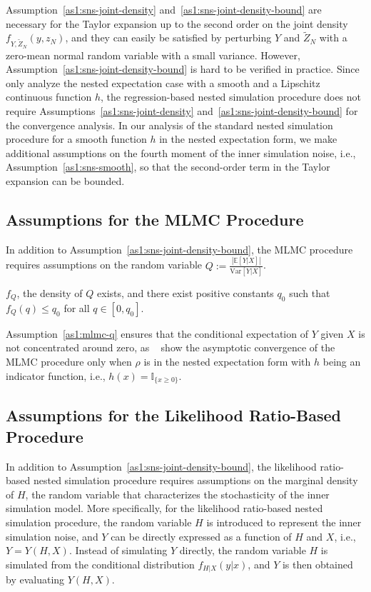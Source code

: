 Assumption~\ref{as1:sns-joint-density} and~\ref{as1:sns-joint-density-bound} are necessary for the Taylor expansion up to the second order on the joint density $f_{Y,\tilde{Z}_N}(y,z_N)$, and they can easily be satisfied by perturbing $Y$ and $\tilde{Z}_N$ with a zero-mean normal random variable with a small variance.
However, Assumption~\ref{as1:sns-joint-density-bound} is hard to be verified in practice.
Since~\cite{broadie2015risk} only analyze the nested expectation case with a smooth and a Lipschitz continuous function $h$, the regression-based nested simulation procedure does not require Assumptions~\ref{as1:sns-joint-density} and~\ref{as1:sns-joint-density-bound} for the convergence analysis.
In our analysis of the standard nested simulation procedure for a smooth function $h$ in the nested expectation form, we make additional assumptions on the fourth moment of the inner simulation noise, i.e., Assumption~\ref{as1:sns-smooth}, so that the second-order term in the Taylor expansion can be bounded. 

\subsection{Assumptions for the MLMC Procedure}
In addition to Assumption~\ref{as1:sns-joint-density-bound}, the MLMC procedure requires assumptions on the random variable $Q:= \frac{|\mathbb{E} \left[ Y | X \right]|}{\text{Var}[Y|X]}$.

\begin{assumption} \label{as1:mlmc-q}
    $f_Q$, the density of $Q$ exists, and there exist positive constants $q_0$ such that $f_Q(q) \leq q_0$ for all $q \in [0, q_0]$.
\end{assumption}

Assumption~\ref{as1:mlmc-q} ensures that the conditional expectation of $Y$ given $X$ is not concentrated around zero, as ~\cite{giles2019multilevel} show the asymptotic convergence of the MLMC procedure only when $\rho$ is in the nested expectation form with $h$ being an indicator function, i.e., $h(x) = \mathbb{I}_{\{x \geq 0\}}$.

\subsection{Assumptions for the Likelihood Ratio-Based Procedure}
In addition to Assumption~\ref{as1:sns-joint-density-bound}, the likelihood ratio-based nested simulation procedure requires assumptions on the marginal density of $H$, the random variable that characterizes the stochasticity of the inner simulation model.
More specifically, for the likelihood ratio-based nested simulation procedure, the random variable $H$ is introduced to represent the inner simulation noise, and $Y$ can be directly expressed as a function of $H$ and $X$, i.e., $Y = Y(H, X)$.
Instead of simulating $Y$ directly, the random variable $H$ is simulated from the conditional distribution $f_{H|X}(y|x)$, and $Y$ is then obtained by evaluating $Y(H, X)$.

